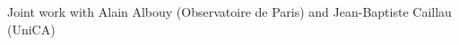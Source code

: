 \documentclass{article}
\begin{document}

 \noindent Joint work with Alain Albouy (Observatoire de Paris) and Jean-Baptiste Caillau (UniCA)
\end{document}

